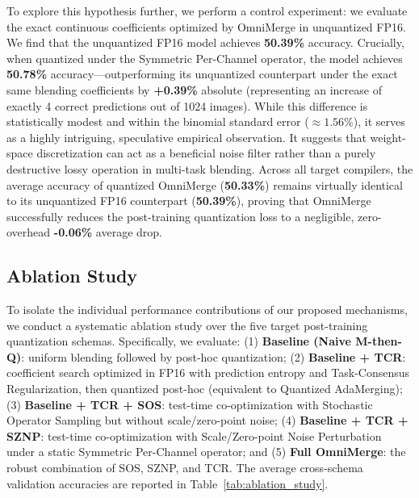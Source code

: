 To explore this hypothesis further, we perform a control experiment: we evaluate the exact continuous coefficients optimized by OmniMerge in unquantized FP16. We find that the unquantized FP16 model achieves \textbf{50.39\%} accuracy. Crucially, when quantized under the Symmetric Per-Channel operator, the model achieves \textbf{50.78\%} accuracy---outperforming its unquantized counterpart under the exact same blending coefficients by \textbf{+0.39\%} absolute (representing an increase of exactly 4 correct predictions out of 1024 images). While this difference is statistically modest and within the binomial standard error ($\approx 1.56\%$), it serves as a highly intriguing, speculative empirical observation. It suggests that weight-space discretization can act as a beneficial noise filter rather than a purely destructive lossy operation in multi-task blending. Across all target compilers, the average accuracy of quantized OmniMerge (\textbf{50.33\%}) remains virtually identical to its unquantized FP16 counterpart (\textbf{50.39\%}), proving that OmniMerge successfully reduces the post-training quantization loss to a negligible, zero-overhead \textbf{-0.06\%} average drop.

\subsection{Ablation Study}
To isolate the individual performance contributions of our proposed mechanisms, we conduct a systematic ablation study over the five target post-training quantization schemas. Specifically, we evaluate: (1) \textbf{Baseline (Naive M-then-Q)}: uniform blending followed by post-hoc quantization; (2) \textbf{Baseline + TCR}: coefficient search optimized in FP16 with prediction entropy and Task-Consensus Regularization, then quantized post-hoc (equivalent to Quantized AdaMerging); (3) \textbf{Baseline + TCR + SOS}: test-time co-optimization with Stochastic Operator Sampling but without scale/zero-point noise; (4) \textbf{Baseline + TCR + SZNP}: test-time co-optimization with Scale/Zero-point Noise Perturbation under a static Symmetric Per-Channel operator; and (5) \textbf{Full OmniMerge}: the robust combination of SOS, SZNP, and TCR. The average cross-schema validation accuracies are reported in Table~\ref{tab:ablation_study}.

